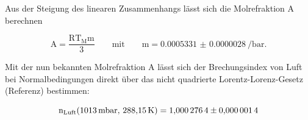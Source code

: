         Aus der Steigung des linearen Zusammenhangs lässt sich die Molrefraktion A berechnen

        \begin{equation}
            \text{A} = \frac{\text{RT}_{\text{M}}\text{m}}{3} \qquad \text{mit} \qquad \text{m}=\SI{0.0005331(28)}{\per\bar}.
        \end{equation}

        Mit der nun bekannten Molrefraktion A lässt sich der Brechungsindex von Luft bei Normalbedingungen direkt über das nicht quadrierte Lorentz-Lorenz-Gesetz (Referenz) bestimmen:

        \begin{equation}
            \text{n}_{\text{Luft}}(\SI{1013}{\milli\bar}, \, \SI{288.15}{\kelvin}) = \num{1.0002764 +- 0.0000014}     
        \end{equation}
        

